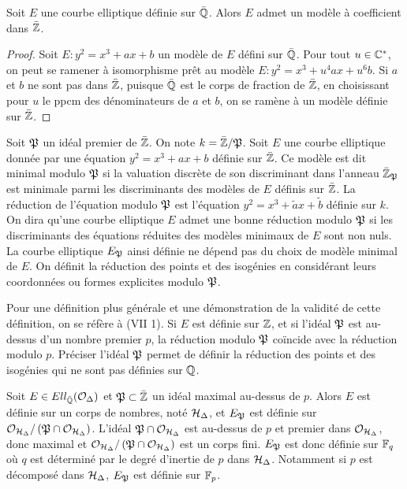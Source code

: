 \begin{Prop}
	Soit $E$ une courbe elliptique définie sur $\bar{\mathbb{Q}}$. Alors $E$ admet un modèle à coefficient dans $\bar{\mathbb{Z}}$. 
\end{Prop}

\begin{proof}
	Soit $E : y^2 = x^3 + ax + b$ un modèle de $E$ défini sur $\bar{\mathbb{Q}}$. Pour tout $u\in\mathbb{C}^{*}$, on peut se ramener à isomorphisme prêt au modèle 
	$E : y^2 = x^3 + u^4ax + u^6b$. Si $a$ et $b$ ne sont pas dans $\bar{\mathbb{Z}}$, puisque $\bar{\mathbb{Q}}$ est le corps de fraction de $\bar{\mathbb{Z}}$, en choisissant pour $u$ le ppcm des dénominateurs de $a$ et $b$, on se ramène à un modèle définie sur $\bar{\mathbb{Z}}$. 
\end{proof}

\begin{Def}
	Soit $\mathfrak{P}$ un idéal premier de $\bar{\mathbb{Z}}$. On note $k = \bar{\mathbb{Z}} / \mathfrak{P}$. Soit $E$ une courbe elliptique donnée par une équation $y^2 = x^3 + ax + b$ définie sur $\bar{\mathbb{Z}}$. Ce modèle est dit minimal modulo $\mathfrak{P}$ si la valuation discrète de son discriminant dans l'anneau $\bar{\mathbb{Z}}_{\mathfrak{P}}$ est minimale parmi les discriminants des modèles de $E$ définis sur $\bar{\mathbb{Z}}$. La réduction de l'équation modulo $\mathfrak{P}$ est l'équation $y^2 = x^3 + \tilde{a}x + \tilde{b}$ définie sur $k$. On dira qu'une courbe elliptique $E$ admet une bonne réduction modulo $\mathfrak{P}$ si les discriminants des équations réduites des modèles minimaux de $E$ sont non nuls. La courbe elliptique $E_{\mathfrak{P}}$ ainsi définie ne dépend pas du choix de modèle minimal de $E$. On définit la réduction des points et des isogénies en considérant leurs coordonnées ou formes explicites modulo $\mathfrak{P}$. 
\end{Def}

\begin{Rem}
	Pour une définition plus générale et une démonstration de la validité de cette définition, on se réfère à \cite{Sil09}(VII 1). Si $E$ est définie sur $\mathbb{Z}$, et si l'idéal $\mathfrak{P}$ est au-dessus d'un nombre premier $p$, la réduction modulo $\mathfrak{P}$ coïncide avec la réduction modulo $p$. Préciser l'idéal $\mathfrak{P}$ permet de définir la réduction des points et des isogénies qui ne sont pas définies sur $\mathbb{Q}$.  
\end{Rem}

\begin{Rem}\label{RemarqueReductionCorpsFinis}
	Soit $E\in Ell_{\bar{\mathbb{Q}}}(\mathcal{O}_{\Delta})$ et $\mathfrak{P}\subset\bar{\mathbb{Z}}$ un idéal maximal au-dessus de $p$. Alors $E$ est définie sur un corps de nombres, noté $\mathcal{H}_\Delta$, et $E_{\mathfrak{P}}$ est définie sur $\mathcal{O}_{\mathcal{H}_\Delta}/\left( \mathfrak{P}\cap\mathcal{O}_{\mathcal{H}_\Delta}\right) $. L'idéal $\mathfrak{P}\cap\mathcal{O}_{\mathcal{H}_\Delta}$ est au-dessus de $p$ et premier dans $\mathcal{O}_{\mathcal{H}_\Delta}$, donc maximal et $\mathcal{O}_{\mathcal{H}_\Delta}/\left( \mathfrak{P}\cap\mathcal{O}_{\mathcal{H}_\Delta}\right)$ est un corps fini. $E_{\mathfrak{P}}$ est donc définie sur $\mathbb{F}_{q}$ où $q$ est déterminé par le degré d'inertie de $p$ dans $\mathcal{H}_\Delta$. Notamment si $p$ est décomposé dans $\mathcal{H}_\Delta$, $E_{\mathfrak{P}}$ est définie sur $\mathbb{F}_{p}$.
	
\end{Rem}

